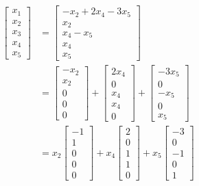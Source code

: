 \documentclass[]{article}
\numberwithin{equation}{section}
\begin{document}
\begin{align}
	\begin{bmatrix}
	x_1 \\
	x_2 \\
	x_3 \\
	x_4 \\
	x_5
	\end{bmatrix}
	&=
	\begin{bmatrix}
	-x_2 + 2x_4 - 3x_5 \\
	x_2 \\
	x_4 - x_5 \\
	x_4 \\
	x_5
	\end{bmatrix} \\
	&=
	\begin{bmatrix}
	-x_2 \\
	x_2 \\
	0 \\
	0 \\
	0
	\end{bmatrix} + 
	\begin{bmatrix}
	2x_4 \\
	0 \\
	x_4 \\
	x_4 \\
	0
	\end{bmatrix} + 
	\begin{bmatrix}
	-3x_5 \\
	0 \\
	-x_5 \\
	0 \\
	x_5
	\end{bmatrix} \\
	&=
	x_2 \begin{bmatrix}
	-1 \\
	1 \\
	0 \\
	0 \\
	0
	\end{bmatrix} + 
	x_4 \begin{bmatrix}
	2 \\
	0 \\
	1 \\
	1 \\
	0
	\end{bmatrix} + 
	x_5 \begin{bmatrix}
	-3 \\
	0 \\
	-1 \\
	0 \\
	1
	\end{bmatrix}
\end{align}
\end{document}
